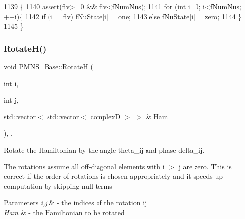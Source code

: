 \begin{DoxyCode}
1139 \{
1140   assert(flv>=0 && flv<\hyperlink{classOscProb_1_1PMNS__Base_a24bb74bed63569dfe88b18fa6a08060e}{fNumNus});
1141   \textcolor{keywordflow}{for} (\textcolor{keywordtype}{int} i=0; i<\hyperlink{classOscProb_1_1PMNS__Base_a24bb74bed63569dfe88b18fa6a08060e}{fNumNus}; ++i)\{
1142     \textcolor{keywordflow}{if} (i==flv) \hyperlink{classOscProb_1_1PMNS__Base_abf99f2339e3ee989600740b5d88063e8}{fNuState}[i] = \hyperlink{classOscProb_1_1PMNS__Base_a7d1d0bbcab30a1fd8c368c40134c51ff}{one};
1143     \textcolor{keywordflow}{else}        \hyperlink{classOscProb_1_1PMNS__Base_abf99f2339e3ee989600740b5d88063e8}{fNuState}[i] = \hyperlink{classOscProb_1_1PMNS__Base_a05e595848c2521dc795efa7645728b94}{zero};
1144   \}
1145 \}
\end{DoxyCode}
\mbox{\label{classOscProb_1_1PMNS__Base_a6a3cf45bbe2349abf06708b65677c044}} 
\subsubsection{\texorpdfstring{Rotate\+H()}{RotateH()}}
{\footnotesize\ttfamily void P\+M\+N\+S\+\_\+\+Base\+::\+RotateH (\begin{DoxyParamCaption}\item[{int}]{i,  }\item[{int}]{j,  }\item[{std\+::vector$<$ std\+::vector$<$ \hyperlink{EigenPoint_8h_a67ca8e107e20610c3fff78d5e726ece0}{complexD} $>$ $>$ \&}]{Ham }\end{DoxyParamCaption})\hspace{0.3cm}{\ttfamily [protected]}, {\ttfamily [virtual]}, {\ttfamily [inherited]}}

Rotate the Hamiltonian by the angle theta\+\_\+ij and phase delta\+\_\+ij.

The rotations assume all off-\/diagonal elements with i $>$ j are zero. This is correct if the order of rotations is chosen appropriately and it speeds up computation by skipping null terms


\begin{DoxyParams}{Parameters}
{\em i,j} & -\/ the indices of the rotation ij \\
\hline
{\em Ham} & -\/ the Hamiltonian to be rotated \\
\hline
\end{DoxyParams}


